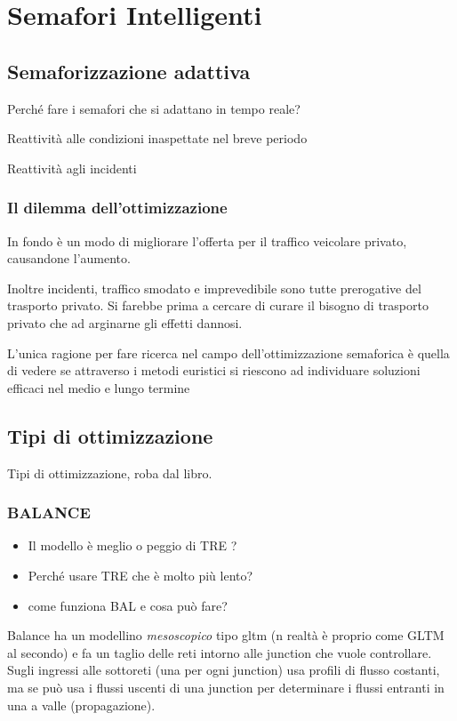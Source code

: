 \chapter{Semafori Intelligenti}
\section{Semaforizzazione adattiva}
Perché fare i semafori che si adattano in tempo reale?

Reattività alle condizioni inaspettate nel breve periodo

Reattività agli incidenti

\subsection{Il dilemma dell'ottimizzazione}
In fondo è un modo di migliorare l'offerta per il traffico veicolare privato, causandone l'aumento.

Inoltre incidenti, traffico smodato e imprevedibile sono tutte prerogative del trasporto privato. Si farebbe prima a cercare di curare il bisogno di trasporto privato che ad arginarne gli effetti dannosi.

L'unica ragione per fare ricerca nel campo dell'ottimizzazione semaforica è quella di vedere se attraverso i metodi euristici si riescono ad individuare soluzioni efficaci nel medio e lungo termine 


\section{Tipi di ottimizzazione}
Tipi di ottimizzazione, roba dal libro.

\subsection{BALANCE}

\begin{itemize}
\item Il modello è meglio o peggio di TRE ?
\item Perché usare TRE che è molto più lento?
\item come funziona BAL e cosa può fare?
\end{itemize}

Balance ha un modellino \emph{mesoscopico} tipo gltm (n realtà è proprio come GLTM al secondo) e fa un taglio delle reti intorno alle junction che vuole controllare. Sugli ingressi alle sottoreti (una per ogni junction) usa profili di flusso costanti, ma se può usa i flussi uscenti di una junction per determinare i flussi entranti in una a valle (propagazione).


